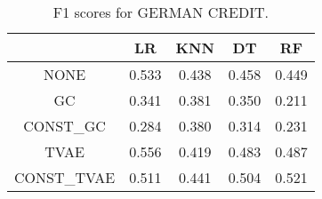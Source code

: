 \begin{table}
\caption{F1 scores for GERMAN CREDIT.}
\label{tab:f1-GERMAN CREDIT}
\begin{tabular}{ccccc}
\toprule
 & LR & KNN & DT & RF \\
\midrule
NONE & 0.533 & 0.438 & 0.458 & 0.449 \\
GC & 0.341 & 0.381 & 0.350 & 0.211 \\
CONST\_GC & 0.284 & 0.380 & 0.314 & 0.231 \\
TVAE & 0.556 & 0.419 & 0.483 & 0.487 \\
CONST\_TVAE & 0.511 & 0.441 & 0.504 & 0.521 \\
\bottomrule
\end{tabular}
\end{table}
